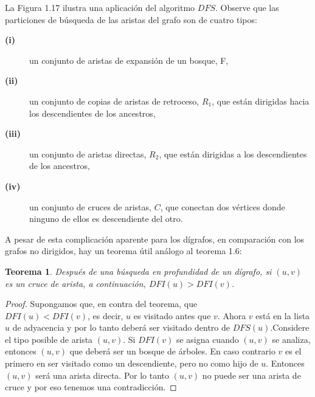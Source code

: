 \documentclass[10pt,a5paper]{book}
\newtheorem{teorema}{Teorema}[chapter]
\begin{document}
La Figura 1.17 ilustra una aplicación del algoritmo $DFS$. Observe que las particiones de búsqueda de las aristas del grafo son de cuatro tipos:
\begin{description}
\item[\textbf{(i)}] un conjunto de aristas de expansión de un bosque, F,
\item[\textbf{(ii)}] un conjunto de copias de aristas de retroceso, $R_1$, que están dirigidas hacia los descendientes de los ancestros,
\item[\textbf{(iii)}] un conjunto de aristas directas, $R_2$, que están dirigidas a los descendientes de los ancestros,
\item[\textbf{(iv)}] un conjunto de cruces de aristas, $C$, que conectan dos vértices donde ninguno de ellos es descendiente del otro.
\end{description}
A pesar de esta complicación aparente para los dígrafos, en comparación con los grafos no dirigidos, hay un teorema útil análogo al teorema 1.6:
\begin{teorema}
Después de una búsqueda en profundidad de un dígrafo, si $(u,v)$ es un cruce de arista, a continuación, $DFI(u) > DFI(v)$.
\end{teorema}
\begin{proof}
Supongamos que, en contra del teorema, que \\$DFI(u) < DFI(v)$, es decir, $u$ es visitado antes que $v$. Ahora $v$ está en la lista $u$ de adyacencia y por lo tanto deberá ser visitado dentro de $DFS(u)$.Considere el tipo posible de arista $(u,v)$. Si $DFI(v)$ se asigna cuando $(u,v)$ se analiza, entonces $(u,v)$ que deberá ser un bosque de árboles. En caso contrario $v$ es el primero en ser visitado como un descendiente, pero no como hijo de $u$. Entonces $(u,v)$ será una arista directa. Por lo tanto $(u,v)$ no puede ser una arista de cruce y por eso tenemos una contradicción.
\end{proof}
\end{document}

